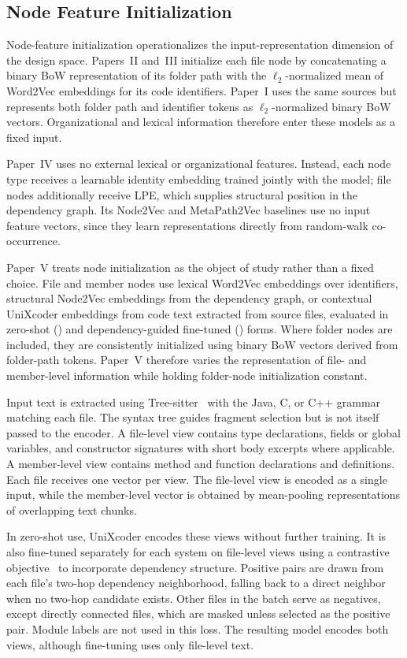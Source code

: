 \subsection{Node Feature Initialization}
\label{sec:node_feature_initialization}

Node-feature initialization operationalizes the input-representation dimension of the design space. Papers~II and~III initialize each file node by concatenating a binary BoW representation of its folder path with the $\ell_2$-normalized mean of Word2Vec embeddings for its code identifiers. Paper~I uses the same sources but represents both folder path and identifier tokens as $\ell_2$-normalized binary BoW vectors. Organizational and lexical information therefore enter these models as a fixed input.

Paper~IV uses no external lexical or organizational features. Instead, each node type receives a learnable identity embedding trained jointly with the model; file nodes additionally receive LPE, which supplies structural position in the dependency graph. Its Node2Vec and MetaPath2Vec baselines use no input feature vectors, since they learn representations directly from random-walk co-occurrence.

Paper~V treats node initialization as the object of study rather than a fixed choice. File and member nodes use lexical Word2Vec embeddings over identifiers, structural Node2Vec embeddings from the dependency graph, or contextual UniXcoder embeddings from code text extracted from source files, evaluated in zero-shot (\zs{}) and dependency-guided fine-tuned (\ft{}) forms. Where folder nodes are included, they are consistently initialized using binary BoW vectors derived from folder-path tokens. Paper~V therefore varies the representation of file- and member-level information while holding folder-node initialization constant.

Input text is extracted using Tree-sitter~\cite{tree_sitter} with the Java, C, or C++ grammar matching each file. The syntax tree guides fragment selection but is not itself passed to the encoder. A file-level view contains type declarations, fields or global variables, and constructor signatures with short body excerpts where applicable. A member-level view contains method and function declarations and definitions. Each file receives one vector per view. The file-level view is encoded as a single input, while the member-level vector is obtained by mean-pooling representations of overlapping text chunks.

In zero-shot use, UniXcoder encodes these views without further training. It is also fine-tuned separately for each system on file-level views using a contrastive objective~\cite{infonce} to incorporate dependency structure. Positive pairs are drawn from each file's two-hop dependency neighborhood, falling back to a direct neighbor when no two-hop candidate exists. Other files in the batch serve as negatives, except directly connected files, which are masked unless selected as the positive pair. Module labels are not used in this loss. The resulting model encodes both views, although fine-tuning uses only file-level text.

